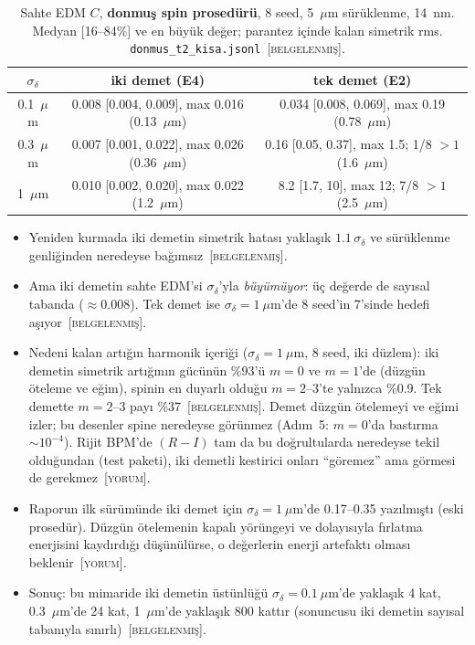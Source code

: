 \documentclass[11pt,a4paper]{article}
\newcommand{\kod}[1]{{\XeTeXinterchartokenstate=0\texttt{#1}}}
\newcommand{\BEL}{\textsc{[belgelenmiş]}}
\newcommand{\YOR}{\textsc{[yorum]}}
\begin{document}
\begin{table}[H]\centering\small
\caption{Sahte EDM $C$, \textbf{donmuş spin prosedürü}, 8 seed, 5~$\mu$m sürüklenme, 14~nm. Medyan
[16--84\%] ve en büyük değer; parantez içinde kalan simetrik rms. \kod{donmus\_t2\_kisa.jsonl}~\BEL.}
\footnotesize
\begin{tabular}{ccc}
\toprule
$\sigma_\delta$ & iki demet (E4) & tek demet (E2) \\
\midrule
0.1~$\mu$m & 0.008 [0.004, 0.009], max 0.016 (0.13~$\mu$m) & 0.034 [0.008, 0.069], max 0.19 (0.78~$\mu$m) \\
0.3~$\mu$m & 0.007 [0.001, 0.022], max 0.026 (0.36~$\mu$m) & 0.16 [0.05, 0.37], max 1.5; 1/8 $>1$ (1.6~$\mu$m) \\
1~$\mu$m & 0.010 [0.002, 0.020], max 0.022 (1.2~$\mu$m) & 8.2 [1.7, 10], max 12; 7/8 $>1$ (2.5~$\mu$m) \\
\bottomrule
\end{tabular}
\end{table}
\begin{itemize}
\item Yeniden kurmada iki demetin simetrik hatası yaklaşık $1.1\,\sigma_\delta$ ve sürüklenme genliğinden
neredeyse bağımsız~\BEL.
\item Ama iki demetin sahte EDM'si $\sigma_\delta$'yla \emph{büyümüyor}: üç değerde de sayısal tabanda
($\approx0.008$). Tek demet ise $\sigma_\delta=1~\mu$m'de 8 seed'in 7'sinde hedefi aşıyor~\BEL.
\item Nedeni kalan artığın harmonik içeriği ($\sigma_\delta=1~\mu$m, 8 seed, iki düzlem): iki demetin
simetrik artığının gücünün \%93'ü $m=0$ ve $m=1$'de (düzgün öteleme ve eğim), spinin en duyarlı olduğu
$m=2$--3'te yalnızca \%0.9. Tek demette $m=2$--3 payı \%37~\BEL. Demet düzgün ötelemeyi ve eğimi izler; bu
desenler spine neredeyse görünmez (Adım~5: $m=0$'da bastırma $\sim10^{-4}$). Rijit BPM'de $(R-I)$ tam da bu
doğrultularda neredeyse tekil olduğundan (test paketi), iki demetli kestirici onları ``göremez'' ama
görmesi de gerekmez~\YOR.
\item Raporun ilk sürümünde iki demet için $\sigma_\delta=1~\mu$m'de 0.17--0.35 yazılmıştı (eski prosedür).
Düzgün ötelemenin kapalı yörüngeyi ve dolayısıyla fırlatma enerjisini kaydırdığı düşünülürse, o değerlerin
enerji artefaktı olması beklenir~\YOR.
\item Sonuç: bu mimaride iki demetin üstünlüğü $\sigma_\delta=0.1~\mu$m'de yaklaşık 4 kat,
0.3~$\mu$m'de 24 kat, 1~$\mu$m'de yaklaşık 800 kattır (sonuncusu iki demetin sayısal tabanıyla sınırlı)~\BEL.
\end{itemize}
\end{document}
